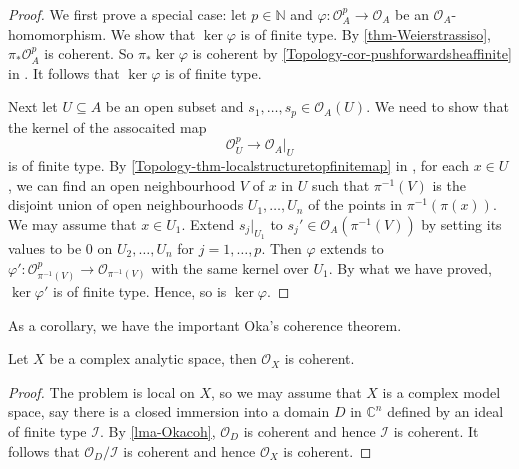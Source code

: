 \begin{proof}
    We first prove a special case: let $p\in \mathbb{N}$ and $\varphi:\mathcal{O}_A^p\rightarrow \mathcal{O}_A$ be an $\mathcal{O}_A$-homomorphism. We show that $\ker \varphi$ is of finite type. By  \cref{thm-Weierstrassiso}, $\pi_*\mathcal{O}_A^p$ is coherent. So $\pi_*\ker \varphi$ is coherent by \cref{Topology-cor-pushforwardsheaffinite} in . It follows that $\ker \varphi$ is of finite type.

    Next let $U\subseteq A$ be an open subset and $s_1,\ldots,s_p\in \mathcal{O}_A(U)$. We need to show that the kernel of the assocaited map
    \[
        \mathcal{O}_U^p\rightarrow \mathcal{O}_A|_U
    \]
    is of finite type. By \cref{Topology-thm-localstructuretopfinitemap} in , for each $x\in U$, we can find an open neighbourhood $V$ of $x$ in $U$ such that $\pi^{-1}(V)$ is the disjoint union of open neighbourhoods $U_1,\ldots,U_n$ of the points in $\pi^{-1}(\pi(x))$. We may assume that $x\in U_1$. Extend $s_j|_{U_1}$ to $s_j'\in \mathcal{O}_A(\pi^{-1}(V))$ by setting its values to be $0$ on $U_2,\ldots,U_n$ for $j=1,\ldots,p$. Then $\varphi$ extends to $\varphi':\mathcal{O}_{\pi^{-1}(V)}^p\rightarrow \mathcal{O}_{\pi^{-1}(V)}$ with the same kernel over $U_1$. By what we have proved, $\ker \varphi'$ is of finite type. Hence, so is $\ker \varphi$.
\end{proof}
As a corollary, we have the important Oka's coherence theorem.
\begin{thm}\label{thm-Okacoh}
    Let $X$ be a complex analytic space, then $\mathcal{O}_X$ is coherent.
\end{thm}
\begin{proof}
    The problem is local on $X$, so we may assume that $X$ is a complex model space, say there is a closed immersion into a domain $D$ in $\mathbb{C}^n$ defined by an ideal of finite type $\mathcal{I}$. By \cref{lma-Okacoh}, $\mathcal{O}_D$ is coherent and hence $\mathcal{I}$ is coherent. It follows that $\mathcal{O}_D/\mathcal{I}$ is coherent and hence $\mathcal{O}_X$ is coherent.
\end{proof}

